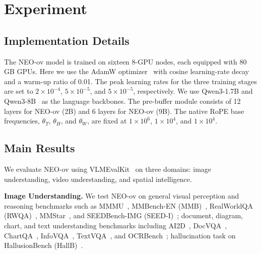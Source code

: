 \documentclass{llmxive}
\begin{document}
\section{Experiment}

\subsection{Implementation Details}

The NEO-ov model is trained on sixteen 8-GPU nodes, each equipped with 80 GB GPUs. Here we use the AdamW optimizer~\citep{Training:AdamW} with cosine learning-rate decay and a warm-up ratio of 0.01. The peak learning rates for the three training stages are set to $2 \times 10^{-4}$, $5 \times 10^{-5}$, and $5 \times 10^{-5}$, respectively.
%
We use Qwen3-1.7B and Qwen3-8B~\citep{TransF:Qwen3} as the language backbones. The pre-buffer module consists of 12 layers for NEO-ov (2B) and 6 layers for NEO-ov (9B). The native RoPE base frequencies, $\theta_T$, $\theta_H$, and $\theta_W$, are fixed at $1 \times 10^{6}$, $1 \times 10^{4}$, and $1 \times 10^{4}$.



\subsection{Main Results}

We evaluate NEO-ov using VLMEvalKit~\cite{VLM:VLMEvalKit} on three domains: image understanding, video understanding, and spatial intelligence.

\textbf{Image Understanding.}
We test NEO-ov on general visual perception and reasoning benchmarks such as MMMU~\cite{Datasets:MMMU}, MMBench-EN (MMB)~\cite{Datasets:MMBench}, RealWorldQA (RWQA)~\cite{Datasets:Realworldqa}, MMStar~\cite{Datasets:MMStar}, and SEEDBench-IMG (SEED-I)~\cite{Datasets:Seed-bench}; document, diagram, chart, and text understanding benchmarks including AI2D~\cite{Datasets:AI2D}, DocVQA~\cite{Datasets:DocVQA}, ChartQA~\cite{Datasets:ChartQA}, InfoVQA~\cite{Datasets:InfoVQA}, TextVQA~\cite{Datasets:TextVQA}, and OCRBench~\cite{Datasets:OCRBench}; hallucination task on HallusionBench (HallB)~\cite{Datasets:Hallusionbench}.
\end{document}
